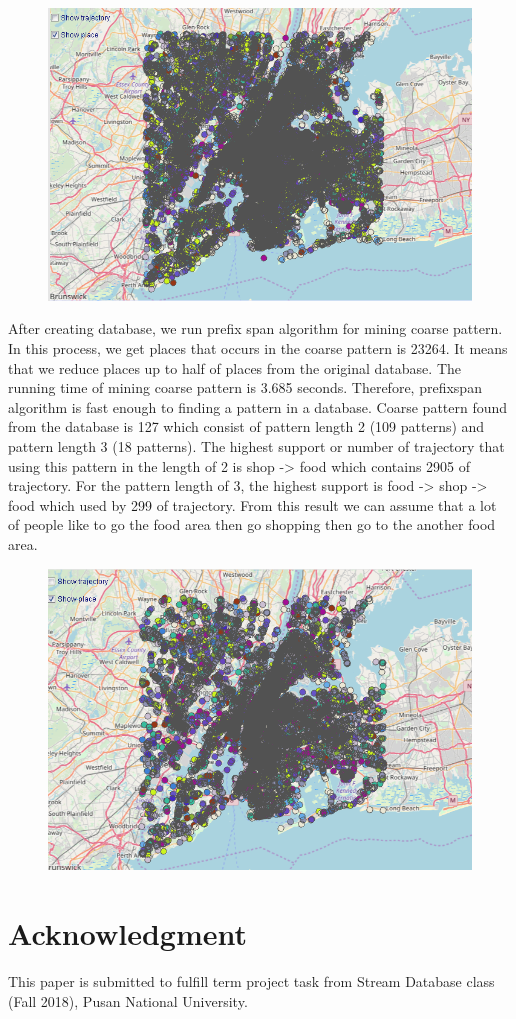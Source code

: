 \documentclass[conference]{IEEEtran}
\begin{document}
\begin{figure}[h!]
	\centering
	\includegraphics[width=0.7\linewidth]{mapDatabase}
	\caption{}
	\label{fig:mapdatabase}
\end{figure}

After creating database, we run prefix span algorithm for mining coarse pattern. In this process, we get places that occurs in the coarse pattern is 23264. It means that we reduce places up to half of places from the original database. The running time of mining coarse pattern is 3.685 seconds. Therefore, prefixspan algorithm is fast enough to finding a pattern in a database. Coarse pattern found from the database is 127 which consist of pattern length 2 (109 patterns) and pattern length 3 (18 patterns). The highest support or number of trajectory that using this pattern in the length of 2 is shop -> food which contains 2905 of trajectory. For the pattern length of 3, the highest support is food -> shop -> food which used by 299 of trajectory. From this result we can assume that a lot of people like to go the food area then go shopping then go to the another food area.  

\begin{figure}
	\centering
	\includegraphics[width=0.7\linewidth]{mapCoarse}
	\caption{}
	\label{fig:mapcoarse}
\end{figure}





\section*{Acknowledgment}
This paper is submitted to fulfill term project task from Stream Database class (Fall 2018), Pusan National University.



\end{document}
